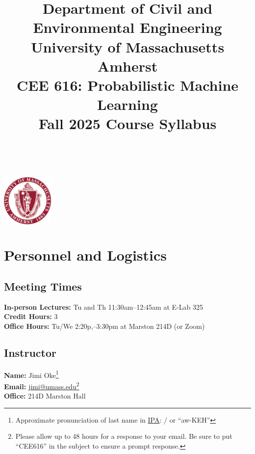 \documentclass[11pt,twoside]{article}
\numberwithin{equation}{section}
\newcommand{\?}{\stackrel{?}{=}}
\begin{document}
 
\title{Department of Civil and Environmental Engineering\\ University of Massachusetts Amherst\\
  {\bf CEE 616: Probabilistic Machine Learning} \\
Fall 2025 {\sc Course Syllabus}
}
\date{}
\maketitle

\thispagestyle{empty}

\tableofcontents

~
\thispagestyle{empty}
\vfill
\begin{center}
  \includegraphics[width=1in]{umass_seal}
  

\end{center}

\eject
\section{Personnel and Logistics}

\subsection{Meeting Times}
\textbf{In-person Lectures:} Tu and Th 11:30am--12:45am at E-Lab 325\\
\textbf{Credit Hours:} 3\\
\textbf{Office Hours:} Tu/We 2:20p,--3:30pm at Marston 214D (or Zoom)

\subsection{Instructor}
\textbf{Name:}  Jimi Oke\footnote{Approximate  pronunciation of last name in \href{https://americanipachart.com/}{IPA}: / or ``aw-KEH''}\\
\textbf{Email:} \href{mailto:jimi@umass.edu}{jimi@umass.edu}\footnote{Please allow up to 48 hours for a response to your email. Be sure to put ``CEE616'' in the subject to ensure a prompt response.}\\
\textbf{Office:} 214D Marston Hall\\
\end{document}
